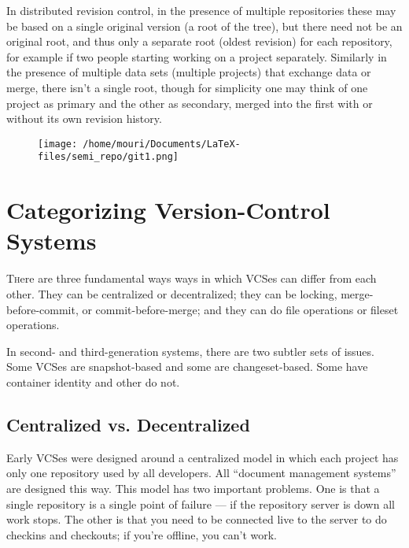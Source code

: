 \documentclass[twoside]{article}
\begin{document}
\begin{multicols}{2}
In distributed revision control, in the presence of multiple repositories these may be based on a single original version (a root of the tree), but there need not be an original root, and thus only a separate root (oldest revision) for each repository, for example if two people starting working on a project separately. Similarly in the presence of multiple data sets (multiple projects) that exchange data or merge, there isn't a single root, though for simplicity one may think of one project as primary and the other as secondary, merged into the first with or without its own revision history.
\begin{figure}[H]
\centering
\texttt{[image: /home/mouri/Documents/LaTeX-files/semi\_repo/git1.png]}
\end{figure}



\section{Categorizing Version-Control Systems}
\lettrine[nindent=0em,lines=3]{T}here are three fundamental ways ways in which VCSes can differ from each other. They can be centralized or decentralized; they can be locking, merge-before-commit, or commit-before-merge; and they can do file operations or fileset operations.

In second- and third-generation systems, there are two subtler sets of issues. Some VCSes are snapshot-based and some are changeset-based. Some have container identity and other do not.

\subsection{Centralized vs. Decentralized}

Early VCSes were designed around a centralized model in which each project has only one repository used by all developers. All “document management systems” are designed this way. This model has two important problems. One is that a single repository is a single point of failure — if the repository server is down all work stops. The other is that you need to be connected live to the server to do checkins and checkouts; if you're offline, you can't work.


\end{multicols}
\end{document}
